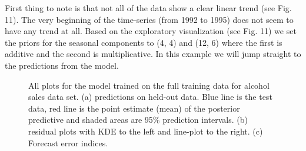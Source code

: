 \documentclass{article}
\begin{document}
\noindent First thing to note is that not all of the data show a clear linear trend (see Fig. 11). The very beginning of the time-series (from 1992 to 1995) does not seem to have any trend at all. Based on the exploratory visualization (see Fig. 11) we set the priors for the seasonal components to (4, 4) and (12, 6) where the first is additive and the second is multiplicative. In this example we will jump straight to the predictions from the model. 

\begin{figure}[H]
    \centering
    \quad
    \quad
    \caption{All plots for the model trained on the full training data for alcohol sales data set. (a) predictions on held-out data. Blue line is the test data, red line is the point estimate (mean) of the posterior predictive and shaded areas are 95\% prediction intervals. (b) residual plots with KDE to the left and line-plot to the right. (c) Forecast error indices. }
\end{figure}
\end{document}
